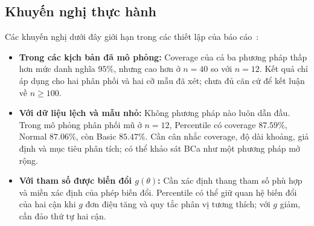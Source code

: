 \documentclass[12pt,a4paper]{article}
\theoremstyle{definition}
\numberwithin{equation}{section}
\begin{document}
	\newpage
\subsection{Khuyến nghị thực hành}

	Các khuyến nghị dưới đây giới hạn trong các thiết lập của báo cáo~\cite{buithuytrang2026,rizzo2019,efron1993,justus2024}:
	\begin{itemize}
    \item \textbf{Trong các kịch bản đã mô phỏng:} Coverage của cả ba phương pháp thấp hơn mức danh nghĩa $95\%$, nhưng cao hơn ở $n=40$ so với $n=12$. Kết quả chỉ áp dụng cho hai phân phối và hai cỡ mẫu đã xét; chưa đủ căn cứ để kết luận về $n\ge100$.
    \item \textbf{Với dữ liệu lệch và mẫu nhỏ:} Không phương pháp nào luôn dẫn đầu. Trong mô phỏng phân phối mũ ở $n=12$, Percentile có coverage $87.59\%$, Normal $87.06\%$, còn Basic $85.47\%$. Cần cân nhắc coverage, độ dài khoảng, giả định và mục tiêu phân tích; có thể khảo sát BCa như một phương pháp mở rộng.
    \item \textbf{Với tham số được biến đổi $g(\theta)$:} Cần xác định thang tham số phù hợp và miền xác định của phép biến đổi. Percentile có thể giữ quan hệ biến đổi của hai cận khi $g$ đơn điệu tăng và quy tắc phân vị tương thích; với $g$ giảm, cần đảo thứ tự hai cận.
\end{itemize}
\end{document}
